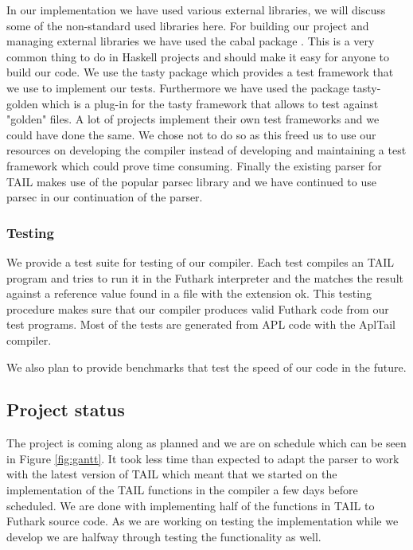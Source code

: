 \documentclass[11pt]{article}
\begin{document}
In our implementation we have used various external libraries, we will discuss some of the non-standard used libraries here.
For building our project and managing external libraries we have used the cabal package \cite{cabal}. This is a very common thing to
do in Haskell projects and should make it easy for anyone to build our code.
We use the tasty package \cite{tasty} which provides a test framework that we use to implement our tests. Furthermore we have used the
package tasty-golden \cite{tasty-golden} which is a plug-in for the tasty framework that allows to test against "golden" files.
A lot of projects implement their own test frameworks and we could have done the same.
We chose not to do so as this freed us to use our resources on developing the compiler instead of developing and maintaining a
test framework which could prove time consuming.
Finally the existing parser for TAIL makes use of the popular parsec library \cite{parsec} and we have continued to use
parsec in our continuation of the parser.

\subsubsection{Testing}

We provide a test suite for testing of our compiler.
Each test compiles an TAIL program and tries to run it in the Futhark interpreter and the matches the result against a reference
value found in a file with the extension ok.
This testing procedure makes sure that our compiler produces valid Futhark code from our test programs.
Most of the tests are generated from APL code with the AplTail compiler.

We also plan to provide benchmarks that test the speed of our code in the future.

\subsection{Project status}
The project is coming along as planned and we are on schedule which can be seen in Figure \ref{fig:gantt}.
It took less time than expected to adapt the parser to work with the latest version of TAIL
which meant that we started on the implementation of the TAIL functions in the compiler a few days before scheduled. 
We are done with implementing half of the functions in TAIL to Futhark source code.
As we are working on testing the implementation while we develop we are halfway through testing the functionality as well. 
\end{document}
